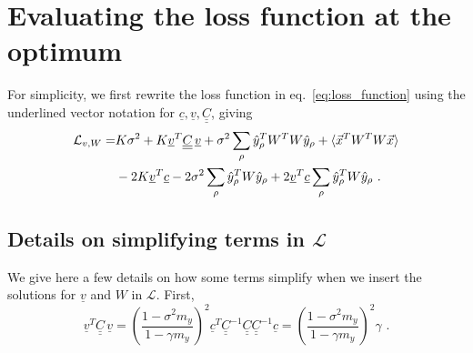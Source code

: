 \documentclass[letter, 12pt]{article}
\newcommand{\dul}[1]{\underline{\underline{#1}}}
\begin{document}
\section{Evaluating the loss function at the optimum}
For simplicity, we first rewrite the loss function in eq.~\eqref{eq:loss_function} using the underlined vector notation for $\underline{c}, \underline{v}, \dul{C}$, giving
\begin{align}
	\mathcal{L}_{v, W} =& K \sigma^2 + K \underline{v}^T \dul{C} \, \underline{v} + \sigma^2 \sum_{\rho} \hat{y}_{\rho}^T W^T W \hat{y}_{\rho} + \braket{\vec{x}^T W^T W \vec{x}} \nonumber \\
	& - 2 K \underline{v}^T \underline{c} - 2\sigma^2 \sum_{\rho} \hat{y}_{\rho}^T W \hat{y}_{\rho} + 2 \underline{v}^T \underline{c} \sum_{\rho} \hat{y}_{\rho}^T W \hat{y}_{\rho} 
	\,\, .
	\label{eq:loss_function_compact}
\end{align}

\subsection{Details on simplifying terms in $\mathcal{L}$}
We give here a few details on how some terms simplify when we insert the solutions for $\underline{v}$ and $W$ in $\mathcal{L}$. First, 
\begin{equation*}
	\underline{v}^T \dul{C} \, \underline{v} = \left(\frac{1 - \sigma^2 m_y}{1 - \gamma m_y} \right)^2 \underline{c}^T \dul{C}^{-1} \dul{C} \dul{C}^{-1} \underline{c} = \left(\frac{1 - \sigma^2 m_y}{1 - \gamma m_y} \right)^2 \gamma \,\, .
\end{equation*}
\end{document}
